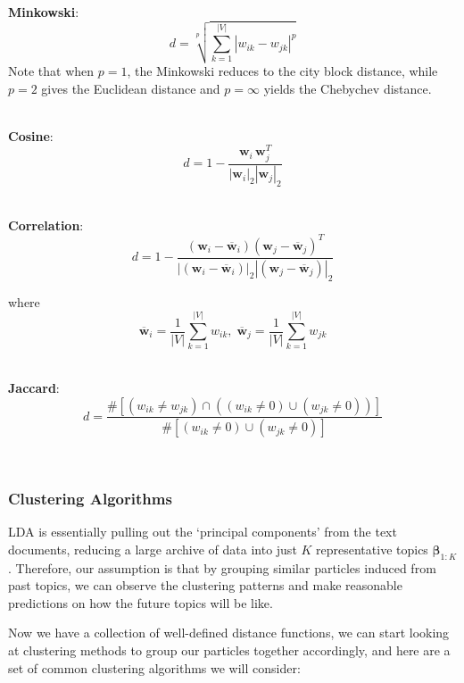 \documentclass[conference]{IEEEtran}
\begin{document}
\-\\
\textbf{Minkowski}: 
\begin{equation*}
	d = \sqrt[p]{\sum_{k=1}^{|V|}|w_{ik} - w_{jk}|^p}
\end{equation*}
 Note that when $p=1$, the Minkowski reduces to the city block distance, while $p=2$ gives the Euclidean distance and $p=\infty$ yields the Chebychev distance.

\-\\
\textbf{Cosine}: 
\begin{equation*}
d = 1 - \frac{\mathbf{w}_i\,\mathbf{w}_j^T}{|\mathbf{w}_i|_2|\mathbf{w}_j|_2}
\end{equation*}

\-\\
\textbf{Correlation}: 
\begin{equation*}
d = 1 - \frac{(\mathbf{w}_i - \overline{\mathbf{w}}_i)(\mathbf{w}_j - \overline{\mathbf{w}}_j)^T}{|(\mathbf{w}_i - \overline{\mathbf{w}}_i)|_2|(\mathbf{w}_j - \overline{\mathbf{w}}_j)|_2}
\end{equation*}

where 
\begin{equation*}
	\overline{\mathbf{w}}_i = \frac{1}{|V|}\sum_{k=1}^{|V|}w_{ik},\;
	\overline{\mathbf{w}}_j = \frac{1}{|V|}\sum_{k=1}^{|V|}w_{jk}
\end{equation*}

\-\\
\textbf{Jaccard}: 
\begin{equation*}
	d = \frac{\# \left[(w_{ik} \neq w_{jk})\cap((w_{ik} \neq 0)\cup(w_{jk} \neq 0))\right]}{\#\left[(w_{ik} \neq 0)\cup(w_{jk} \neq 0)\right]}
\end{equation*}

\-\\

\subsubsection{Clustering Algorithms}
LDA is essentially pulling out the `principal components' from the text documents, reducing a large archive of data into just $K$ representative topics $\mathbf{\beta}_{1:K}$. Therefore, our assumption is that by grouping similar particles induced from past topics, we can observe the clustering patterns and make reasonable predictions on how the future topics will be like.

Now we have a collection of well-defined distance functions, we can start looking at clustering methods to group our particles together accordingly, and here are a set of common clustering algorithms we will consider:
\end{document}
